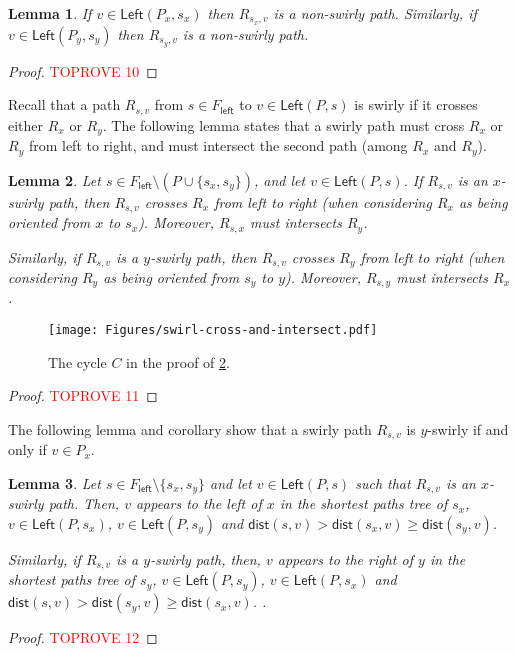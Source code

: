 \documentclass{article}
\newcommand{\Left}{\mathsf{Left}}
\newcommand{\leftside}{\mathsf{left}}
\newcommand{\dist}{\mathsf{dist}}
\newtheorem{lemma}{Lemma}
\begin{document}
\begin{lemma}\label{lem:sx-to-Px-non-swirly}
    If $v\in \Left(P_x,s_x)$ then $R_{s_x,v}$ is a non-swirly path.
    Similarly, if $v\in \Left(P_y,s_y)$ then $R_{s_y,v}$ is a non-swirly path.
\end{lemma}
\begin{proof}\textcolor{red}{TOPROVE 10}\end{proof}


Recall that a path $R_{s,v}$ from $s\in F_{\leftside}$ to $v\in \Left(P,s)$ is swirly if it crosses either $R_x$ or $R_y$.
The following lemma states that a swirly path must cross $R_x$ or $R_y$ from left to right, and must intersect the second path (among $R_x$ and $R_y$).

\begin{lemma}\label{lem:swirl-cross-and-intersect}
    Let $s\in F_{\leftside}\setminus (P\cup\{s_x,s_y\})$, and let $v\in\Left(P,s)$.
    If $R_{s,v}$ is an $x$-swirly path, then $R_{s,v}$ crosses $R_x$ from left to right (when considering $R_x$ as being oriented from $x$ to $s_x$).
    Moreover, $R_{s,x}$ must intersects $R_y$.

    Similarly, if $R_{s,v}$ is a $y$-swirly path, then $R_{s,v}$ crosses $R_y$ from left to right (when considering $R_y$ as being oriented from $s_y$ to $y$).
    Moreover, $R_{s,y}$ must intersects $R_x$.
\end{lemma}
\begin{figure}[ht]
    \centering
    \texttt{[image: Figures/swirl-cross-and-intersect.pdf]}
    \caption{The cycle $C$ in the proof of \cref{lem:swirl-cross-and-intersect}.}
    \label{fig:swirl-cross-and-intersect}
\end{figure}
\begin{proof}\textcolor{red}{TOPROVE 11}\end{proof}



The following lemma and corollary show that a swirly path $R_{s,v}$ is $y$-swirly if and only if $v\in P_x$.







\begin{lemma}\label{lem:s-x-swirl}
    Let $s\in F_{\leftside}\setminus\{s_x,s_y\}$ and let $v\in \Left(P,s)$ such that $R_{s,v}$ is an $x$-swirly path.
    Then, $v$ appears to the left of $x$ in the shortest paths tree of $s_x$, $v\in\Left(P,s_x)$, $v\in \Left(P,s_y)$ and $\dist(s,v)>\dist(s_x,v)\ge\dist(s_y,v)$.

    Similarly, if $R_{s,v}$ is a $y$-swirly path, then, $v$ appears to the right of $y$ in the shortest paths tree of $s_y$, $v\in\Left(P,s_y)$, $v\in \Left(P,s_x)$ and $\dist(s,v)>\dist(s_y,v)\ge\dist(s_x,v)$. .
\end{lemma}
\begin{proof}\textcolor{red}{TOPROVE 12}\end{proof}
\end{document}
